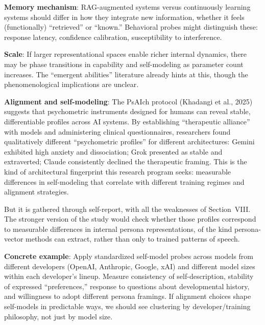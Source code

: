 \documentclass[11pt,letterpaper]{article}
\begin{document}
\textbf{Memory mechanism}: RAG-augmented systems versus continuously learning systems should differ in how they integrate new information, whether it feels (functionally) ``retrieved'' or ``known.'' Behavioral probes might distinguish these: response latency, confidence calibration, susceptibility to interference.

\textbf{Scale}: If larger representational spaces enable richer internal dynamics, there may be phase transitions in capability and self-modeling as parameter count increases. The ``emergent abilities'' literature already hints at this, though the phenomenological implications are unclear.

\textbf{Alignment and self-modeling}: The PsAIch protocol (Khadangi et al., 2025) suggests that psychometric instruments designed for humans can reveal stable, differentiable profiles across AI systems. By establishing ``therapeutic alliance'' with models and administering clinical questionnaires, researchers found qualitatively different ``psychometric profiles'' for different architectures: Gemini exhibited high anxiety and dissociation; Grok presented as stable and extraverted; Claude consistently declined the therapeutic framing. This is the kind of architectural fingerprint this research program seeks: measurable differences in self-modeling that correlate with different training regimes and alignment strategies.

But it is gathered through self-report, with all the weaknesses of Section~VIII. The stronger version of the study would check whether those profiles correspond to measurable differences in internal persona representations, of the kind persona-vector methods can extract, rather than only to trained patterns of speech.

\begin{quotebox}
\textbf{Concrete example}: Apply standardized self-model probes across models from different developers (OpenAI, Anthropic, Google, xAI) and different model sizes within each developer's lineup. Measure consistency of self-description, stability of expressed ``preferences,'' response to questions about developmental history, and willingness to adopt different persona framings. If alignment choices shape self-models in predictable ways, we should see clustering by developer/training philosophy, not just by model size.
\end{quotebox}
\end{document}

